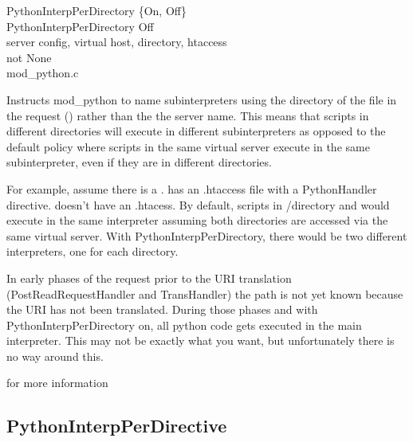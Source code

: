 PythonInterpPerDirectory \{On, Off\} \\
PythonInterpPerDirectory Off\\
server config, virtual host, directory, htaccess\\
not None\\
mod_python.c

Instructs mod_python to name subinterpreters using the directory of
the file in the request () rather than the the
server name. This means that scripts in different directories will
execute in different subinterpreters as opposed to the default policy
where scripts in the same virtual server execute in the same
subinterpreter, even if they are in different directories.

For example, assume there is a
.  has an .htaccess
file with a PythonHandler directive.  
doesn't have an .htacess. By default, scripts in /directory and
 would execute in the same interpreter assuming
both directories are accessed via the same virtual server. With
PythonInterpPerDirectory, there would be two different interpreters,
one for each directory.

 In early phases of the request prior to the URI translation
(PostReadRequestHandler and TransHandler) the path is not yet known
because the URI has not been translated. During those phases and with
PythonInterpPerDirectory on, all python code gets executed in the
main interpreter. This may not be exactly what you want, but
unfortunately there is no way around this.

\begin{seealso}
	{for more information}
\end{seealso}

\subsection{PythonInterpPerDirective\label{dir-other-ipdv}}


